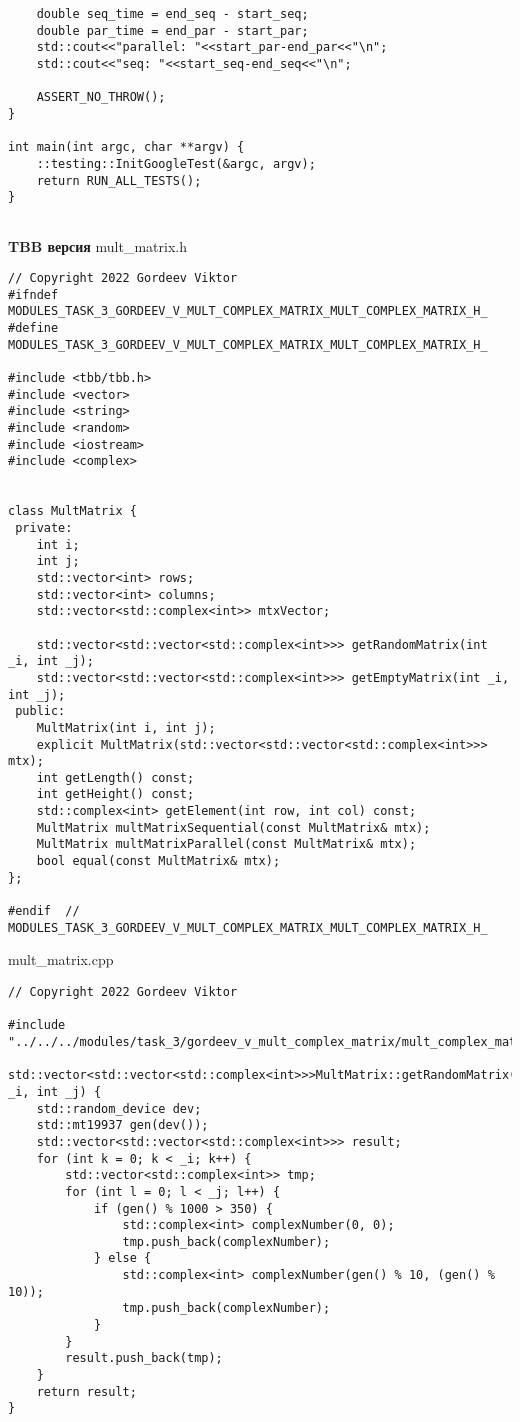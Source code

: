 \documentclass{report}
\begin{document}
\begin{enumerate}
\begin{lstlisting}
    double seq_time = end_seq - start_seq;
    double par_time = end_par - start_par;
    std::cout<<"parallel: "<<start_par-end_par<<"\n";
    std::cout<<"seq: "<<start_seq-end_seq<<"\n";

    ASSERT_NO_THROW();
}

int main(int argc, char **argv) {
    ::testing::InitGoogleTest(&argc, argv);
    return RUN_ALL_TESTS();
}


\end{lstlisting}

\textbf{TBB версия}
\newline
\newline mult_matrix.h
\begin{lstlisting}
// Copyright 2022 Gordeev Viktor
#ifndef MODULES_TASK_3_GORDEEV_V_MULT_COMPLEX_MATRIX_MULT_COMPLEX_MATRIX_H_
#define MODULES_TASK_3_GORDEEV_V_MULT_COMPLEX_MATRIX_MULT_COMPLEX_MATRIX_H_

#include <tbb/tbb.h>
#include <vector>
#include <string>
#include <random>
#include <iostream>
#include <complex>


class MultMatrix {
 private:
    int i;
    int j;
    std::vector<int> rows;
    std::vector<int> columns;
    std::vector<std::complex<int>> mtxVector;

    std::vector<std::vector<std::complex<int>>> getRandomMatrix(int _i, int _j);
    std::vector<std::vector<std::complex<int>>> getEmptyMatrix(int _i, int _j);
 public:
    MultMatrix(int i, int j);
    explicit MultMatrix(std::vector<std::vector<std::complex<int>>> mtx);
    int getLength() const;
    int getHeight() const;
    std::complex<int> getElement(int row, int col) const;
    MultMatrix multMatrixSequential(const MultMatrix& mtx);
    MultMatrix multMatrixParallel(const MultMatrix& mtx);
    bool equal(const MultMatrix& mtx);
};

#endif  // MODULES_TASK_3_GORDEEV_V_MULT_COMPLEX_MATRIX_MULT_COMPLEX_MATRIX_H_

\end{lstlisting}
mult_matrix.cpp
\begin{lstlisting}
// Copyright 2022 Gordeev Viktor

#include "../../../modules/task_3/gordeev_v_mult_complex_matrix/mult_complex_matrix.h"

std::vector<std::vector<std::complex<int>>>MultMatrix::getRandomMatrix(int _i, int _j) {
    std::random_device dev;
    std::mt19937 gen(dev());
    std::vector<std::vector<std::complex<int>>> result;
    for (int k = 0; k < _i; k++) {
        std::vector<std::complex<int>> tmp;
        for (int l = 0; l < _j; l++) {
            if (gen() % 1000 > 350) {
                std::complex<int> complexNumber(0, 0);
                tmp.push_back(complexNumber);
            } else {
                std::complex<int> complexNumber(gen() % 10, (gen() % 10));
                tmp.push_back(complexNumber);
            }
        }
        result.push_back(tmp);
    }
    return result;
}


\end{lstlisting}
\end{enumerate}
\end{document}
